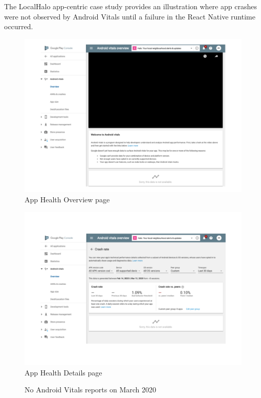 The LocalHalo app-centric case study provides an illustration where app crashes were not observed by Android Vitals until a failure in the React Native runtime occurred.

\begin{figure}[htbp!]
\begin{minipage}{.49\linewidth}
  \centering
  \includegraphics[width=\linewidth]{images/localhalo/apphealthoverviewplace_5550596_no_data.pdf}
  {\footnotesize App Health Overview page}
\end{minipage}\hfill%
\begin{minipage}{.49\linewidth}
  \centering
  \includegraphics[width=\linewidth]{images/localhalo/apphealthdetailsplace_55505963_no_data.pdf}
  {\footnotesize App Health Details page}
\end{minipage}
    \caption{No Android Vitals reports on  March 2020}
    \label{fig:localhalo-android-vitals-no-data-16-march-2020}
\end{figure}


